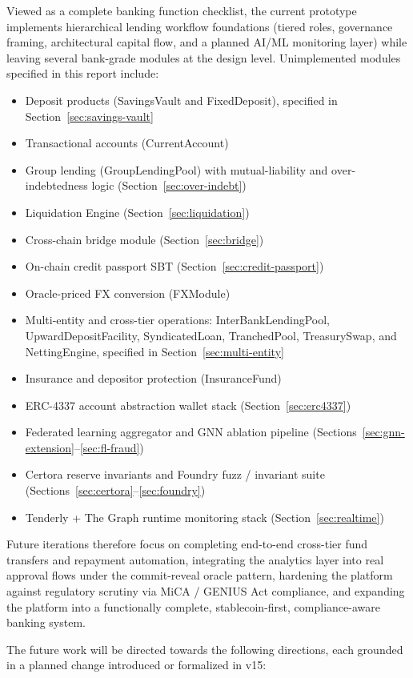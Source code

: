 \documentclass[12pt,a4paper]{report}
\begin{document}
Viewed as a complete banking function checklist, the current prototype implements hierarchical lending workflow foundations (tiered roles, governance framing, architectural capital flow, and a planned AI/ML monitoring layer) while leaving several bank-grade modules at the design level. Unimplemented modules specified in this report include:
\begin{itemize}[noitemsep]
\item Deposit products (SavingsVault and FixedDeposit), specified in Section~\ref{sec:savings-vault}
\item Transactional accounts (CurrentAccount)
\item Group lending (GroupLendingPool) with mutual-liability and over-indebtedness logic (Section~\ref{sec:over-indebt})
\item Liquidation Engine (Section~\ref{sec:liquidation})
\item Cross-chain bridge module (Section~\ref{sec:bridge})
\item On-chain credit passport SBT (Section~\ref{sec:credit-passport})
\item Oracle-priced FX conversion (FXModule)
\item Multi-entity and cross-tier operations: InterBankLendingPool, UpwardDepositFacility, SyndicatedLoan, TranchedPool, TreasurySwap, and NettingEngine, specified in Section~\ref{sec:multi-entity}
\item Insurance and depositor protection (InsuranceFund)
\item ERC-4337 account abstraction wallet stack (Section~\ref{sec:erc4337})
\item Federated learning aggregator and GNN ablation pipeline (Sections~\ref{sec:gnn-extension}--\ref{sec:fl-fraud})
\item Certora reserve invariants and Foundry fuzz / invariant suite (Sections~\ref{sec:certora}--\ref{sec:foundry})
\item Tenderly + The Graph runtime monitoring stack (Section~\ref{sec:realtime})
\end{itemize}
Future iterations therefore focus on completing end-to-end cross-tier fund transfers and repayment automation, integrating the analytics layer into real approval flows under the commit-reveal oracle pattern, hardening the platform against regulatory scrutiny via MiCA / GENIUS Act compliance, and expanding the platform into a functionally complete, stablecoin-first, compliance-aware banking system.

The future work will be directed towards the following directions, each grounded in a planned change introduced or formalized in v15:
\end{document}
